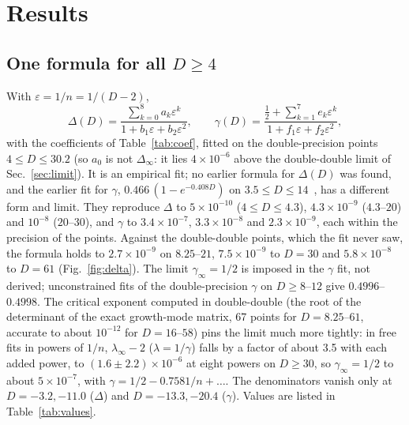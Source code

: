 \documentclass[aps,prd,onecolumn,superscriptaddress,nofootinbib,10pt]{revtex4-2}
\newcommand{\Dinf}{\Delta_\infty}
\newcommand{\eps}{\varepsilon}
\begin{document}
\section{Results}
\label{sec:results}

\subsection{One formula for all $D \ge 4$}

With $\eps = 1/n = 1/(D-2)$,
\begin{equation}
\Delta(D) = \frac{\sum_{k=0}^{8} a_k \eps^k}{1 + b_1\eps + b_2\eps^2}, \qquad
\gamma(D) = \frac{\tfrac12 + \sum_{k=1}^{7} e_k \eps^k}{1 + f_1\eps + f_2\eps^2},
\label{eq:formula}
\end{equation}
with the coefficients of Table~\ref{tab:coef}, fitted on the double-precision points $4 \le D \le 30.2$ (so $a_0$ is not
$\Dinf$: it lies $4\times10^{-6}$ above the double-double limit of Sec.~\ref{sec:limit}). It is an empirical fit; no earlier
formula for $\Delta(D)$ was found, and the earlier fit for $\gamma$, $0.466\,(1 - e^{-0.408D})$ on
$3.5 \le D \le 14$~\cite{BlandEtAl2005}, has a different form and limit. They reproduce
$\Delta$ to $5\times10^{-10}$ ($4 \le D \le 4.3$), $4.3\times10^{-9}$ ($4.3$--$20$) and $10^{-8}$ ($20$--$30$), and $\gamma$ to
$3.4\times10^{-7}$, $3.3\times10^{-8}$ and $2.3\times10^{-9}$, each within the precision of the points. Against the
double-double points, which the fit never saw, the formula holds to $2.7\times10^{-9}$ on $8.25$--$21$,
$7.5\times10^{-9}$ to $D = 30$ and $5.8\times10^{-8}$ to $D = 61$ (Fig.~\ref{fig:delta}). The limit $\gamma_\infty = 1/2$ is
imposed in the $\gamma$ fit, not derived; unconstrained fits of the double-precision $\gamma$ on $D \ge 8$--$12$ give
$0.4996$--$0.4998$. The critical exponent computed in double-double (the root of the determinant of the exact growth-mode
matrix, 67 points for $D = 8.25$--$61$, accurate to about $10^{-12}$ for $D = 16$--$58$) pins the limit much more tightly: in
free fits in powers of $1/n$, $\lambda_\infty - 2$ ($\lambda = 1/\gamma$) falls by a factor of about 3.5 with each added power,
to $(1.6 \pm 2.2)\times10^{-6}$ at eight powers on $D \ge 30$, so $\gamma_\infty = 1/2$ to about $5\times10^{-7}$, with
$\gamma = 1/2 - 0.7581/n + \dots$. The denominators
vanish only at $D = -3.2, -11.0$ ($\Delta$) and $D = -13.3, -20.4$ ($\gamma$). Values are listed in Table~\ref{tab:values}.
\end{document}
